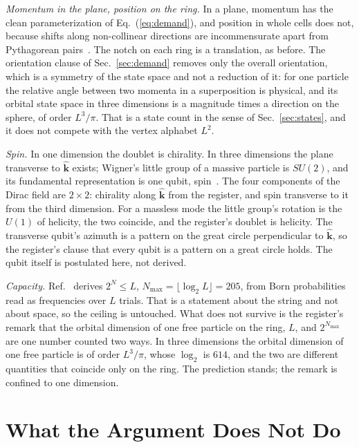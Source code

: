 \documentclass[aps,prd,twocolumn,superscriptaddress,nofootinbib]{revtex4-2}
\begin{document}
\textit{Momentum in the plane, position on the ring.} In a plane, momentum has the clean parameterization of Eq.~(\ref{eq:demand}), and position in whole cells does not, because shifts along non-collinear directions are incommensurate apart from Pythagorean pairs~\cite{korytko2026c}. The notch on each ring is a translation, as before. The orientation clause of Sec.~\ref{sec:demand} removes only the overall orientation, which is a symmetry of the state space and not a reduction of it: for one particle the relative angle between two momenta in a superposition is physical, and its orbital state space in three dimensions is a magnitude times a direction on the sphere, of order $L^3/\pi$. That is a state count in the sense of Sec.~\ref{sec:states}, and it does not compete with the vertex alphabet $L^2$.

\textit{Spin.} In one dimension the doublet is chirality. In three dimensions the plane transverse to $\hat{\mathbf{k}}$ exists; Wigner's little group of a massive particle is $SU(2)$, and its fundamental representation is one qubit, spin~\cite{weinberg1995}. The four components of the Dirac field are $2\times2$: chirality along $\hat{\mathbf{k}}$ from the register, and spin transverse to it from the third dimension. For a massless mode the little group's rotation is the $U(1)$ of helicity, the two coincide, and the register's doublet is helicity. The transverse qubit's azimuth is a pattern on the great circle perpendicular to $\hat{\mathbf{k}}$, so the register's clause that every qubit is a pattern on a great circle holds. The qubit itself is postulated here, not derived.

\textit{Capacity.} Ref.~\cite{korytko2026c} derives $2^N \le L$, $N_{\max} = \lfloor\log_2L\rfloor = 205$, from Born probabilities read as frequencies over $L$ trials. That is a statement about the string and not about space, so the ceiling is untouched. What does not survive is the register's remark that the orbital dimension of one free particle on the ring, $L$, and $2^{N_{\max}}$ are one number counted two ways. In three dimensions the orbital dimension of one free particle is of order $L^3/\pi$, whose $\log_2$ is $614$, and the two are different quantities that coincide only on the ring. The prediction stands; the remark is confined to one dimension.

\section{What the Argument Does Not Do}
\label{sec:limits}
\end{document}
